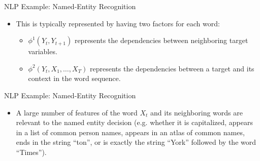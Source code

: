 \documentclass[11pt]{beamer}
\begin{document}
{
}

\begin{frame}{NLP Example: Named-Entity Recognition \cite{pgmslides}}
\setlength{\topsep}{0pt}
\setlength{\partopsep}{0pt}
\centering
\resizebox{0.8\textwidth}{!}{\nerexample}
\begin{itemize}
	\item This is typically represented by having two factors for each word:
	\begin{itemize}
		\item $\phi^{1}(Y_{t},Y_{t+1})$ represents the dependencies
		between neighboring target variables.
		\item $\phi^{2}(Y_{t},X_{1},\ldots,X_{T})$ represents the
		dependencies between a target and its context in the word
		sequence.
	\end{itemize}
\end{itemize}
\end{frame}

\begin{frame}{NLP Example: Named-Entity Recognition \cite{pgmslides}}
\setlength{\topsep}{0pt}
\setlength{\partopsep}{0pt}
\centering
\resizebox{0.8\textwidth}{!}{\nerexample}
\begin{itemize}
	\item A large number of features of the word $X_{t}$ and its neighboring
	words are relevant to the named entity decision (e.g. whether it is
	capitalized, appears in a list of common person names, appears in an
	atlas of common names, ends in the string ``ton'', or is exactly the
	string ``York'' followed by the word ``Times'').
\end{itemize}
\end{frame}
\end{document}
